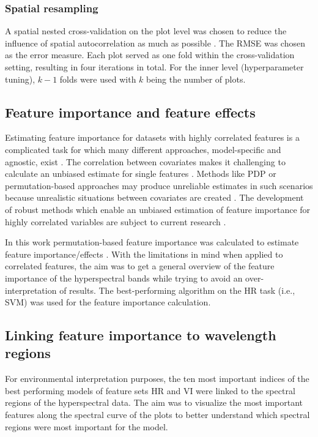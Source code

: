 \documentclass[remotesensing,article,submit,moreauthors,pdftex]{Definitions/mdpi}
\begin{document}
\subsubsection{Spatial resampling}

A spatial nested cross-validation on the plot level was chosen to reduce the influence of spatial autocorrelation as much as possible \cite{schratz2019, sperrorest}.
The \ac{RMSE} was chosen as the error measure.
Each plot served as one fold within the cross-validation setting, resulting in four iterations in total.
For the inner level (hyperparameter tuning), \(k - 1\) folds were used with \(k\) being the number of plots.

\subsection{Feature importance and feature effects}

Estimating feature importance for datasets with highly correlated features is a complicated task for which many different approaches, model-specific and agnostic, exist \cite{friedman2001, hastie2001, greenwell2018}.
The correlation between covariates makes it challenging to calculate an unbiased estimate for single features \cite{molnar2019}.
Methods like \ac{PDP} or permutation-based approaches may produce unreliable estimates in such scenarios because unrealistic situations between covariates are created \cite{molnar2019}.
The development of robust methods which enable an unbiased estimation of feature importance for highly correlated variables are subject to current research \cite{brenning2021}.

In this work permutation-based feature importance was calculated to estimate feature importance/effects \cite{apley2019}.
With the limitations in mind when applied to correlated features, the aim was to get a general overview of the feature importance of the hyperspectral bands while trying to avoid an over-interpretation of results.
The best-performing algorithm on the HR task (i.e., SVM) was used for the feature importance calculation.

\subsection{Linking feature importance to wavelength regions}

For environmental interpretation purposes, the ten most important indices of the best performing models of feature sets HR and VI were linked to the spectral regions of the hyperspectral data.
The aim was to visualize the most important features along the spectral curve of the plots to better understand which spectral regions were most important for the model.
\end{document}
